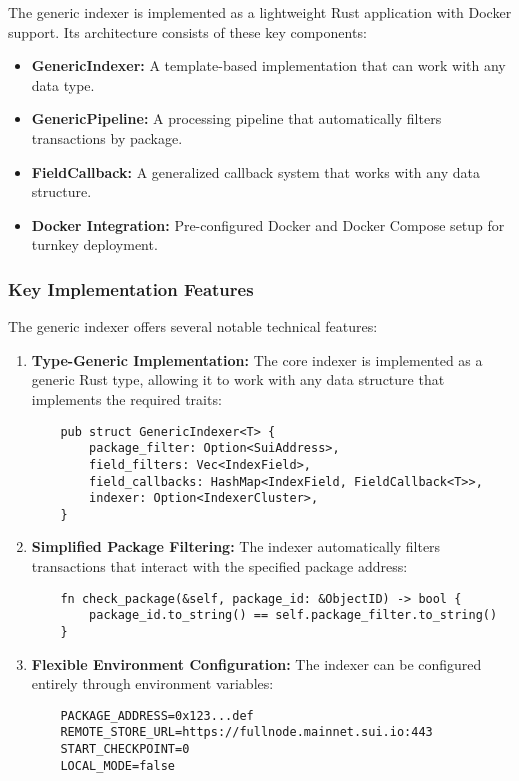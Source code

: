 The generic indexer is implemented as a lightweight Rust application with Docker support. Its architecture consists of these key components:

\begin{itemize}
    \item \textbf{GenericIndexer:} A template-based implementation that can work with any data type.
    \item \textbf{GenericPipeline:} A processing pipeline that automatically filters transactions by package.
    \item \textbf{FieldCallback:} A generalized callback system that works with any data structure.
    \item \textbf{Docker Integration:} Pre-configured Docker and Docker Compose setup for turnkey deployment.
\end{itemize}

\subsubsection{Key Implementation Features}

The generic indexer offers several notable technical features:

\begin{enumerate}
    \item \textbf{Type-Generic Implementation:} The core indexer is implemented as a generic Rust type, allowing it to work with any data structure that implements the required traits:

    \begin{verbatim}
    pub struct GenericIndexer<T> {
        package_filter: Option<SuiAddress>,
        field_filters: Vec<IndexField>,
        field_callbacks: HashMap<IndexField, FieldCallback<T>>,
        indexer: Option<IndexerCluster>,
    }
    \end{verbatim}

    \item \textbf{Simplified Package Filtering:} The indexer automatically filters transactions that interact with the specified package address:

    \begin{verbatim}
    fn check_package(&self, package_id: &ObjectID) -> bool {
        package_id.to_string() == self.package_filter.to_string()
    }
    \end{verbatim}

    \item \textbf{Flexible Environment Configuration:} The indexer can be configured entirely through environment variables:

    \begin{verbatim}
    PACKAGE_ADDRESS=0x123...def
    REMOTE_STORE_URL=https://fullnode.mainnet.sui.io:443
    START_CHECKPOINT=0
    LOCAL_MODE=false
    \end{verbatim}
\end{enumerate}

